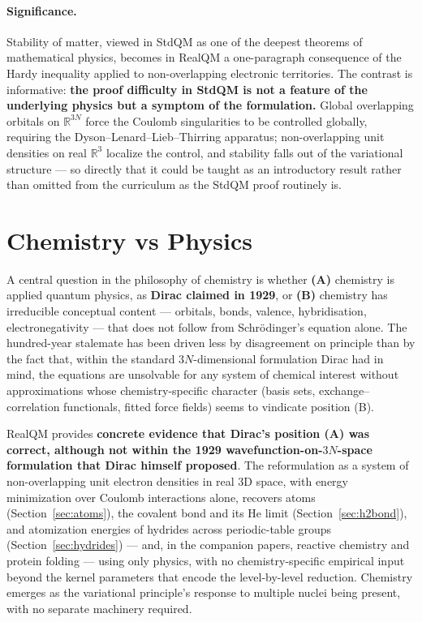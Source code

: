 \documentclass[11pt]{article}
\begin{document}
\paragraph{Significance.}
Stability of matter, viewed in StdQM as one of the deepest theorems of mathematical physics, becomes in RealQM a one-paragraph consequence of the Hardy inequality applied to non-overlapping electronic territories. The contrast is informative: \textbf{the proof difficulty in StdQM is not a feature of the underlying physics but a symptom of the formulation.} Global overlapping orbitals on $\mathbb{R}^{3N}$ force the Coulomb singularities to be controlled globally, requiring the Dyson--Lenard--Lieb--Thirring apparatus; non-overlapping unit densities on real $\mathbb{R}^3$ localize the control, and stability falls out of the variational structure --- so directly that it could be taught as an introductory result rather than omitted from the curriculum as the StdQM proof routinely is.


\section{Chemistry vs Physics}\label{sec:chemvphys}

A central question in the philosophy of chemistry is whether \textbf{(A)} chemistry is applied quantum physics, as \textbf{Dirac claimed in 1929}, or \textbf{(B)} chemistry has irreducible conceptual content --- orbitals, bonds, valence, hybridisation, electronegativity --- that does not follow from Schr\"odinger's equation alone. The hundred-year stalemate has been driven less by disagreement on principle than by the fact that, within the standard $3N$-dimensional formulation Dirac had in mind, the equations are unsolvable for any system of chemical interest without approximations whose chemistry-specific character (basis sets, exchange--correlation functionals, fitted force fields) seems to vindicate position (B).

RealQM provides \textbf{concrete evidence that Dirac's position (A) was correct, although not within the 1929 wavefunction-on-$3N$-space formulation that Dirac himself proposed}. The reformulation as a system of non-overlapping unit electron densities in real 3D space, with energy minimization over Coulomb interactions alone, recovers atoms (Section~\ref{sec:atoms}), the covalent bond and its He limit (Section~\ref{sec:h2bond}), and atomization energies of hydrides across periodic-table groups (Section~\ref{sec:hydrides}) --- and, in the companion papers, reactive chemistry and protein folding --- using only physics, with no chemistry-specific empirical input beyond the kernel parameters that encode the level-by-level reduction. Chemistry emerges as the variational principle's response to multiple nuclei being present, with no separate machinery required.
\end{document}
